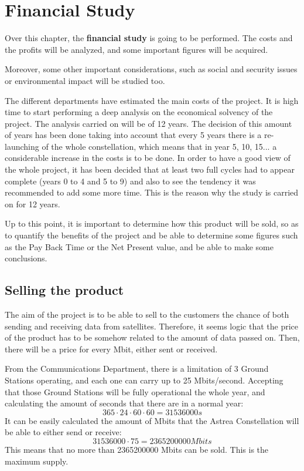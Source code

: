 \chapter{Financial Study}
Over this chapter, the \textbf{financial study} is going to be performed. The costs and the profits will be analyzed, and some important figures will be acquired. 

Moreover, some other important considerations, such as social and security issues or environmental impact will be studied too.

The different departments have estimated the main costs of the project. It is high time to start performing a deep analysis on the economical solvency of the project. The analysis carried on will be of 12 years. The decision of this amount of years has been done taking into account that every 5 years there is a re-launching of the whole constellation, which means that in year 5, 10, 15... a considerable increase in the costs is to be done. In order to have a good view of the whole project, it has been decided that at least two full cycles had to appear complete (years 0 to 4 and 5 to 9) and also to see the tendency it was recommended to add some more time. This is the reason why the study is carried on for 12 years. 

Up to this point, it is important to determine how this product will be sold, so as to quantify the benefits of the project and be able to determine some figures such as the Pay Back Time or the Net Present value, and be able to make some conclusions. 

\section{Selling the product}
The aim of the project is to be able to sell to the customers the chance of both sending and receiving data from satellites. Therefore, it seems logic that the price of the product has to be somehow related to the amount of data passed on. Then, there will be a price for every Mbit, either sent or received. 

From the Communications Department, there is a limitation of 3 Ground Stations operating, and each one can carry up to 25 Mbits/second. Accepting that those Ground Stations will be fully operational the whole year, and calculating the amount of seconds that there are in a normal year:
\begin{equation}
365 \cdot 24 \cdot 60 \cdot 60 = 31536000 s
\end{equation}
It can be easily calculated the amount of Mbits that the Astrea Constellation will be able to either send or receive:
\begin{equation}
31536000 \cdot 75 = 2365200000 Mbits
\end{equation}
This means that no more than 2365200000 Mbits can be sold. This is the maximum supply.

